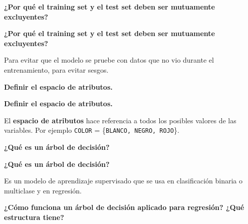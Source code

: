 \documentclass[10pt]{memoir}
\begin{document}
\clearpage
\begin{center}
	\textbf{\Large ¿Por qué el training set y el test set deben ser mutuamente excluyentes?} \\
\end{center}

\clearpage
\begin{center}
	\textbf{\Large ¿Por qué el training set y el test set deben ser mutuamente excluyentes?} \\
\end{center}
\noindent Para evitar que el modelo se pruebe con datos que no vio durante el entrenamiento, para evitar sesgos.

\clearpage
\begin{center}
	\textbf{\Large Definir el espacio de atributos.} \\
\end{center}

\clearpage
\begin{center}
	\textbf{\Large Definir el espacio de atributos.} \\
\end{center}
\noindent El \textbf{espacio de atributos} hace referencia a todos los posibles valores de las variables. Por ejemplo \texttt{COLOR} = \{\texttt{BLANCO, NEGRO, ROJO}\}.

\clearpage
\begin{center}
	\textbf{\Large ¿Qué es un árbol de decisión?} \\
\end{center}

\clearpage
\begin{center}
	\textbf{\Large ¿Qué es un árbol de decisión?} \\
\end{center}
\noindent Es un modelo de aprendizaje supervisado que se usa en clasificación binaria o multiclase y en regresión.

\clearpage
\begin{center}
	\textbf{\Large ¿Cómo funciona un árbol de decisión aplicado para regresión? ¿Qué estructura tiene?} \\
\end{center}
\end{document}
